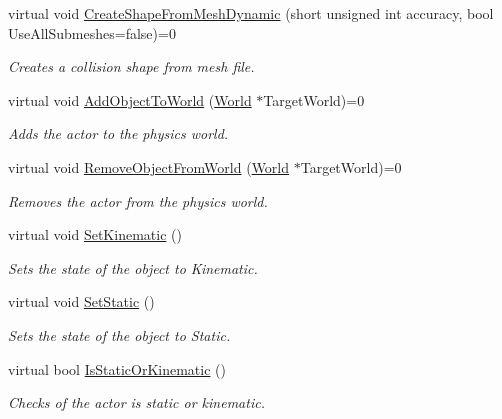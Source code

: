 \begin{DoxyCompactItemize}
virtual void \hyperlink{classphys_1_1ActorBase_ada78fff2625d1154025627c98dc844c8}{CreateShapeFromMeshDynamic} (short unsigned int accuracy, bool UseAllSubmeshes=false)=0
\begin{DoxyCompactList}\small\item\em Creates a collision shape from mesh file. \item\end{DoxyCompactList}\item 
virtual void \hyperlink{classphys_1_1ActorBase_a3d28e4c4a33f50210101695cb33ded3b}{AddObjectToWorld} (\hyperlink{classphys_1_1World}{World} $\ast$TargetWorld)=0
\begin{DoxyCompactList}\small\item\em Adds the actor to the physics world. \item\end{DoxyCompactList}\item 
virtual void \hyperlink{classphys_1_1ActorBase_aaa787de7ec5d7d1d8428ea78f37bcb40}{RemoveObjectFromWorld} (\hyperlink{classphys_1_1World}{World} $\ast$TargetWorld)=0
\begin{DoxyCompactList}\small\item\em Removes the actor from the physics world. \item\end{DoxyCompactList}\item 
virtual void \hyperlink{classphys_1_1ActorBase_acd5613286ec14fb2a8e5ed5f5003dc5f}{SetKinematic} ()
\begin{DoxyCompactList}\small\item\em Sets the state of the object to Kinematic. \item\end{DoxyCompactList}\item 
virtual void \hyperlink{classphys_1_1ActorBase_af0219532fe71d1d84042a20a88fe5037}{SetStatic} ()
\begin{DoxyCompactList}\small\item\em Sets the state of the object to Static. \item\end{DoxyCompactList}\item 
virtual bool \hyperlink{classphys_1_1ActorBase_a0758873d315a0f70871649493d78d739}{IsStaticOrKinematic} ()
\begin{DoxyCompactList}\small\item\em Checks of the actor is static or kinematic. \item\end{DoxyCompactList}\item 

\end{DoxyCompactItemize}
